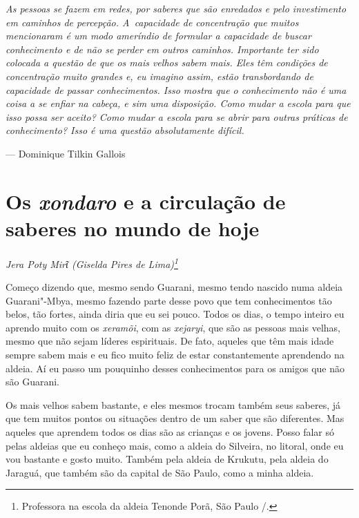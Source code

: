 \begin{flushleft}
\begin{minipage}[c]{0.85\textwidth}
\raggedright
\footnotesize
\emph{As pessoas se fazem em redes, por saberes que são enredados e pelo
investimento em caminhos de percepção. A~capacidade de concentração que
muitos mencionaram é um modo ameríndio de formular a capacidade de
buscar conhecimento e de não se perder em outros caminhos. Importante
ter sido colocada a questão de que os mais velhos sabem mais. Eles têm
condições de concentração muito grandes e, eu imagino assim, estão
transbordando de capacidade de passar conhecimentos. Isso mostra que o
conhecimento não é uma coisa a se enfiar na cabeça, e sim uma
disposição. Como mudar a escola para que isso possa ser aceito? Como
mudar a escola para se abrir para outras práticas de conhecimento? Isso
é uma questão absolutamente difícil.}

\smallskip
\hspace*{\fill}--- Dominique Tilkin Gallois
\end{minipage}
\end{flushleft}

\chapter{Os \emph{xondaro} e a circulação de saberes no mundo de hoje}
\begin{flushright}
\emph{Jera Poty Mirῖ (Giselda Pires de Lima)\footnote{Professora na escola da aldeia Tenonde Porã, São Paulo /.}}
\end{flushright}  

\noindent
Começo dizendo que, mesmo sendo Guarani, mesmo tendo nascido numa aldeia
Guarani"-Mbya, mesmo fazendo parte desse povo que tem conhecimentos tão
belos, tão fortes, ainda diria que eu sei pouco. Todos os dias, o tempo
inteiro eu aprendo muito com os \emph{xeramõi}, com as \emph{xejaryi}, que são as
pessoas mais velhas, mesmo que não sejam líderes espirituais. De fato,
aqueles que têm mais idade sempre sabem mais e eu fico muito feliz de
estar constantemente aprendendo na aldeia. Aí eu passo um pouquinho
desses conhecimentos para os amigos que não são Guarani.

Os mais velhos sabem bastante, e eles mesmos trocam também seus saberes,
já que tem muitos pontos ou situações dentro de um saber que são
diferentes. Mas aqueles que aprendem todos os dias são as crianças e os
jovens. Posso falar só pelas aldeias que eu conheço mais, como a aldeia
do Silveira, no litoral, onde eu vou bastante e gosto muito. Também
pela aldeia de Krukutu, pela aldeia do Jaraguá, que também são da
capital de São Paulo, como a minha aldeia.

